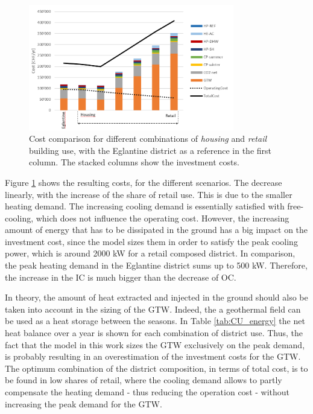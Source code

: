 \documentclass{article}
\begin{document}
\begin{figure}[htp]
	\centering
	\includegraphics[width=0.8\textwidth]{CU_SA_TC.png}
	\caption{Cost comparison for different combinations of \textit{housing} and \textit{retail} building use, with the Eglantine district as a reference in the first column. The stacked columns show the investment costs.}
	\label{fig:CU_TC}
\end{figure}

Figure \ref{fig:CU_TC} shows the resulting costs, for the different scenarios. The decrease linearly, with the increase of the share of retail use. This is due to the smaller heating demand. The increasing cooling demand is essentially satisfied with free-cooling, which does not influence the operating cost. However, the increasing amount of energy that has to be dissipated in the ground has a big impact on the investment cost, since the model sizes them in order to satisfy the peak cooling power, which is around 2000 kW for a retail composed district. In comparison, the peak heating demand in the Eglantine district sums up to 500 kW. Therefore, the increase in the IC is much bigger than the decrease of OC. 

In theory, the amount of heat extracted and injected in the ground should also be taken into account in the sizing of the GTW. Indeed, the a geothermal field can be used as a heat storage between the seasons. In Table \ref{tab:CU_energy} the net heat balance over a year is shown for each combination of district use. Thus, the fact that the model in this work sizes the GTW exclusively on the peak demand, is probably resulting in an overestimation of the investment costs for the GTW. \\

The optimum combination of the district composition, in terms of total cost, is to be found in low shares of retail, where the cooling demand allows to partly compensate the heating demand - thus reducing the operation cost - without increasing the peak demand for the GTW.
\end{document}
